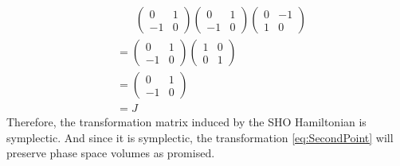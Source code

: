 \documentclass[hidelinks,notitlepage]{book}
\begin{document}
\begin{align}
\nonumber
&\phantom{=i}
\begin{pmatrix}
0 & 1 \\
-1 & 0
\end{pmatrix}
\begin{pmatrix}
0 & 1 \\
-1 & 0
\end{pmatrix}
\begin{pmatrix}
0 & -1 \\
1 & 0
\end{pmatrix} \\
\nonumber
&=
\begin{pmatrix}
0 & 1 \\
-1 & 0
\end{pmatrix}
\begin{pmatrix}
1 & 0 \\
0 & 1
\end{pmatrix} \\
\nonumber
&=
\begin{pmatrix}
0 & 1 \\
-1 & 0
\end{pmatrix} \\
\nonumber
&= J
\end{align}
Therefore, the transformation matrix induced by the SHO Hamiltonian is symplectic.  And since it is symplectic, the transformation \cref{eq:SecondPoint} will preserve phase space volumes as promised.
\end{document}
